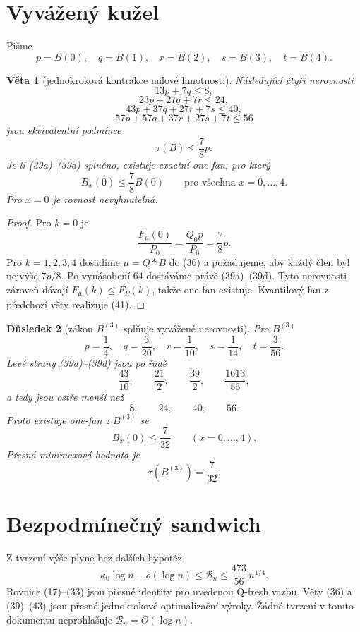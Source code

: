 \documentclass[11pt,a4paper]{article}
\newtheorem{theorem}{Věta}
\newtheorem{corollary}[theorem]{Důsledek}
\theoremstyle{definition}
\theoremstyle{remark}
\theoremstyle{plain}
\begin{document}
\section{Vyvážený kužel}

Pišme
\[
p=B(0),\quad q=B(1),\quad r=B(2),\quad s=B(3),\quad t=B(4).
\]

\begin{theorem}[jednokroková kontrakce nulové hmotnosti]
Následující čtyři nerovnosti
\[
13p+7q\le8,
\tag{39a}
\]
\[
23p+27q+7r\le24,
\tag{39b}
\]
\[
43p+37q+27r+7s\le40,
\tag{39c}
\]
\[
57p+57q+37r+27s+7t\le56
\tag{39d}
\]
jsou ekvivalentní podmínce
\[
\tau(B)\le\frac78p.
\tag{40}
\]
Je-li (39a)--(39d) splněno, existuje exactní one-fan, pro který
\[
\boxed{
B_x(0)\le\frac78B(0)
\qquad\text{pro všechna }x=0,\dots,4.
}
\tag{41}
\]
Pro $x=0$ je rovnost nevyhnutelná.
\end{theorem}

\begin{proof}
Pro $k=0$ je
\[
\frac{F_\mu(0)}{P_0}
=
\frac{Q_0p}{P_0}
=
\frac78p.
\]
Pro $k=1,2,3,4$ dosadíme $\mu=Q*B$ do (36) a požadujeme, aby
každý člen byl nejvýše $7p/8$. Po vynásobení $64$ dostáváme
právě (39a)--(39d). Tyto nerovnosti zároveň dávají
$F_\mu(k)\le F_P(k)$, takže one-fan existuje. Kvantilový fan z
předchozí věty realizuje (41).
\end{proof}

\begin{corollary}[zákon $B^{(3)}$ splňuje vyvážené nerovnosti]
Pro $B^{(3)}$
\[
p=\frac14,\quad
q=\frac3{20},\quad
r=\frac1{10},\quad
s=\frac1{14},\quad
t=\frac3{56}.
\]
Levé strany (39a)--(39d) jsou po řadě
\[
\frac{43}{10},\qquad
\frac{21}{2},\qquad
\frac{39}{2},\qquad
\frac{1613}{56},
\]
a tedy jsou ostře menší než
\[
8,\qquad24,\qquad40,\qquad56.
\]
Proto existuje one-fan z $B^{(3)}$ se
\[
B_x(0)\le\frac7{32}
\qquad(x=0,\dots,4).
\tag{42}
\]
Přesná minimaxová hodnota je
\[
\boxed{\tau(B^{(3)})=\frac7{32}.}
\tag{43}
\]
\end{corollary}

\section{Bezpodmínečný sandwich}

Z tvrzení výše plyne bez dalších hypotéz
\[
\boxed{
\kappa_0\log n-o(\log n)
\le
\mathcal B_n
\le
\frac{473}{56}\,n^{1/4}.
}
\tag{44}
\]
Rovnice (17)--(33) jsou přesné identity pro uvedenou Q-fresh vazbu.
Věty (36) a (39)--(43) jsou přesné jednokrokové optimalizační výroky.
Žádné tvrzení v tomto dokumentu neprohlašuje
$\mathcal B_n=O(\log n)$.
\end{document}
